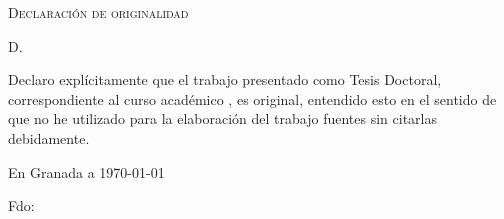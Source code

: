 %

\thispagestyle{empty}

\hfill\vfill

\textsc{Declaración de originalidad}\\\bigskip

D. \miNombre \\\medskip

Declaro explícitamente que el trabajo presentado como Tesis Doctoral, correspondiente al curso académico \miCurso, es original, entendido esto en el sentido de que no he utilizado para la elaboración del trabajo fuentes sin citarlas debidamente.
\medskip

En Granada a \today 
\vspace{3cm}
\begin{center} 
Fdo: \miNombre 

\end{center}

\vfill

\cleardoublepage
\endinput

